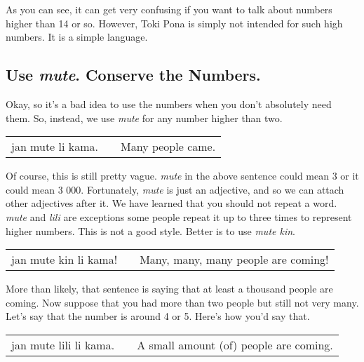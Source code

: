 As you can see, it can get very confusing if you want to talk about numbers higher than 14 or so.
However, Toki Pona is simply not intended for such high numbers. 
It is a simple language. 
%
\newpage
{}
\subsection*{Use \textit{mute}. Conserve the Numbers.}
%
Okay, so it's a bad idea to use the numbers when you don't absolutely need them. 
So, instead, we use \textit{mute} for any number higher than two.

\begin{supertabular}{p{5,5cm}|ll}
jan mute li kama. && Many people came. \\
\end{supertabular} 

Of course, this is still pretty vague. 
\textit{mute} in the above sentence could mean 3 or it could mean 3 000. 
Fortunately, \textit{mute} is just an adjective, and so we can attach other adjectives after it. 
We have learned that you should not repeat a word. \textit{mute} and \textit{lili} are exceptions some people repeat it up to three times to represent higher numbers. 
This is not a good style. 
Better is to use \textit{mute kin}. 

\begin{supertabular}{p{5,5cm}|ll}
jan mute kin li kama! && Many, many, many people are coming! \\
\end{supertabular} 

More than likely, that sentence is saying that at least a thousand people are coming.  
Now suppose that you had more than two people but still not very many. 
Let's say that the number is around 4 or 5. Here's how you'd say that. 

\begin{supertabular}{p{5,5cm}|ll}
jan mute lili li kama. && A small amount (of) people are coming. \\
\end{supertabular} 
%
